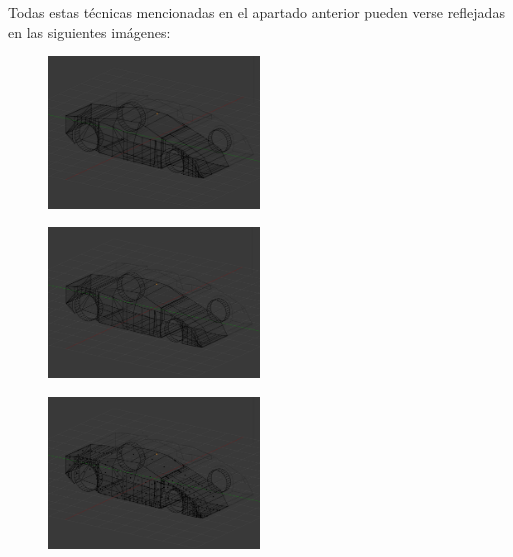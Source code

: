 \documentclass[10pt]{article}
\begin{document}
Todas estas técnicas mencionadas en el apartado anterior pueden verse reflejadas en las siguientes imágenes:

\begin{figure}[H]
	\begin{center}
 		\includegraphics[width = 0.5\textwidth]{Imagenes/modelVertex.eps}
	\end{center} 
\end{figure}

\begin{figure}[H]
	\begin{center}
 		\includegraphics[width = 0.5\textwidth]{Imagenes/modelEdges.eps}
	\end{center} 
\end{figure}

\begin{figure}[H]
	\begin{center}
 		\includegraphics[width = 0.5\textwidth]{Imagenes/modelFaces.eps}
	\end{center} 
\end{figure}
\end{document}
